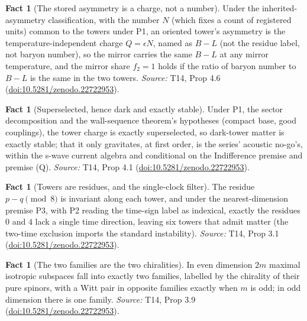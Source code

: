 \documentclass[11pt]{article}
\theoremstyle{definition}
\newtheorem{fact}[theorem]{Fact}
\theoremstyle{plain}
\begin{document}
\begin{fact}[The stored asymmetry is a charge, not a number]\label{c:dark-matter.stored-asymmetry-charge-not-number}
Under the inherited-asymmetry classification, with the number $N$ (which fixes a count of registered units) common to the towers under P1, an oriented tower's asymmetry is the temperature-independent charge $Q = \epsilon N$, named as $B - L$ (not the residue label, not baryon number), so the mirror carries the same $B - L$ at any mirror temperature, and the mirror share $f_{2} = 1$ holds if the ratio of baryon number to $B - L$ is the same in the two towers.
\emph{Source:} T14, Prop 4.6 (\href{https://doi.org/10.5281/zenodo.22722953}{doi:10.5281/zenodo.22722953}).
\end{fact}

\begin{fact}[Superselected, hence dark and exactly stable]\label{c:dark-matter.superselected-hence-dark-exactly-stable}
Under P1, the sector decomposition and the wall-sequence theorem's hypotheses (compact base, good couplings), the tower charge is exactly superselected, so dark-tower matter is exactly stable; that it only gravitates, at first order, is the series' acoustic no-go's, within the s-wave current algebra and conditional on the Indifference premise and premise (Q).
\emph{Source:} T14, Prop 4.1 (\href{https://doi.org/10.5281/zenodo.22722953}{doi:10.5281/zenodo.22722953}).
\end{fact}

\begin{fact}[Towers are residues, and the single-clock filter]\label{c:dark-matter.towers-are-residues-single-clock-filter}
The residue $p - q \pmod 8$ is invariant along each tower, and under the nearest-dimension premise P3, with P2 reading the time-sign label as indexical, exactly the residues $0$ and $4$ lack a single time direction, leaving six towers that admit matter (the two-time exclusion imports the standard instability).
\emph{Source:} T14, Prop 3.1 (\href{https://doi.org/10.5281/zenodo.22722953}{doi:10.5281/zenodo.22722953}).
\end{fact}

\begin{fact}[The two families are the two chiralities]\label{c:dark-matter.two-families-are-two-chiralities}
In even dimension $2m$ maximal isotropic subspaces fall into exactly two families, labelled by the chirality of their pure spinors, with a Witt pair in opposite families exactly when $m$ is odd; in odd dimension there is one family.
\emph{Source:} T14, Prop 3.9 (\href{https://doi.org/10.5281/zenodo.22722953}{doi:10.5281/zenodo.22722953}).
\end{fact}
\end{document}
